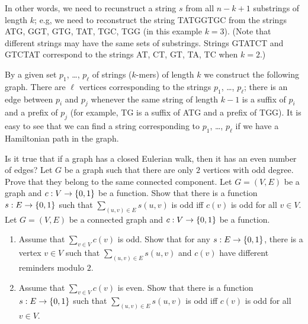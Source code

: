 In other words, we need to recunstruct a string $s$ from all $n - k + 1$
substrings of length $k$; e.g, we need to reconstruct the string TATGGTGC
from the strings ATG, GGT, GTG, TAT, TGC, TGG (in this example $k = 3$).
(Note that different strings may have the same sets of substrings.
Strings GTATCT and GTCTAT correspond to the strings
AT, CT, GT, TA, TC when $k = 2$.)

By a given set $p_1$, \dots, $p_\ell$ of strings ($k$-mers) of length $k$
we construct the following graph. There are $\ell$ vertices corresponding to
the strings $p_1$, \dots, $p_\ell$; there is an edge between $p_i$ and $p_j$
whenever the same string of length $k - 1$ is a suffix of $p_i$ and a
prefix of $p_j$ (for example, TG is a suffix of ATG and a prefix of TGG).
It is easy to see that we can find a string corresponding to
$p_1$, \dots, $p_\ell$ if we have a Hamiltonian path in the graph.

\begin{chapterendexercises}
  \exercise Is it true that if a graph has a closed Eulerian walk, then it has
    an even number of edges?
  \exercise[recommended] Let $G$ be a graph such that there are only $2$
    vertices with odd degree. Prove that they belong to the same connected
    component.
  \exercise Let $G = (V, E)$ be a graph and $c : V \to \set{0, 1}$ be a
    function. Show that there is a function $s : E \to \set{0, 1}$
    such that $\sum_{(u, v) \in E} s(u, v)$ is odd iff $c(v)$ is odd
    for all $v \in V$.
  \exercise Let $G = (V, E)$ be a connected graph and $c : V \to \set{0, 1}$
    be a function.
    \begin{enumerate}
      \item Assume that $\sum_{v \in V} c(v)$ is odd.
        Show that for any $s : E \to \set{0, 1}$, there is a vertex
        $v \in V$ such that $\sum_{(u, v) \in E} s(u, v)$ and $c(v)$
        have different reminders modulo $2$.
      \item Assume that $\sum_{v \in V} c(v)$ is even.
        Show that there is a function $s : E \to \set{0, 1}$
        such that $\sum_{(u, v) \in E} s(u, v)$ is odd iff $c(v)$ is odd
        for all $v \in V$.
    \end{enumerate}
\end{chapterendexercises}
